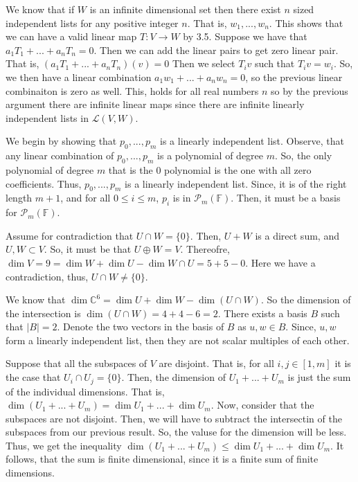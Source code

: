 \documentclass[10pt, twocolumn]{article}
\newcommand{\C}{\mathbb{C}}
\newcommand{\F}{\mathbb{F}}
\newcommand{\poly}[2]{\mathcal{P}_{#1}\left(#2\right)}
\begin{document}
\begin{q}[9]
	We know that if $ W $ is an infinite dimensional set then there exist $ n $ sized independent lists for any positive integer $ n $. 
	That is, $ w_1, ..., w_n $.
	This shows that we can have a valid linear map $ T: V \to W $ by 3.5. 
	Suppose we have that $ a_1 T_1 + ... + a_n T_n = 0 $. 
	Then we can add the linear pairs to get zero linear pair. 
	That is, 
	$ (a_1 T_1 + ... + a_n T_n)(v) = 0 $
	Then we select $ T_i v $ such that $ T_i v = w_i $. 
	So, we then have a linear combination $ a_1 w_1 + ... + a_n w_n = 0 $, so the previous linear combinaiton is zero as well.
	This, holds for all real numbers $ n$ so by the previous argument there are  infinite linear maps since there are infinite linearly independent lists in $ \mathcal{L} (V, W) $.
\end{q}
\begin{q}[10]
	We begin by showing that $ p_0,..., p_m $ is a linearly independent list. 	
	Observe, that any linear combination of $ p_0,..., p_m $ is a polynomial of degree $ m $. 
	So, the only polynomial of degree $ m $ that is the $ 0 $ polynomial is the one with all zero coefficients. 
	Thus, $ p_0,..., p_m $ is a linearly independent list. 
	Since, it is of the right length $ m + 1 $, and for all $ 0 \leq i \leq m $, $ p_i $ is in $ \poly{m}{\F} $.
	Then, it must be a basis for $ \poly{m}{\F} $.
\end{q}
\begin{q}[12]
	Assume for contradiction that $ U \cap W = \{0\}$.
	Then, $ U + W $ is a direct sum, and $ U, W \subset V $. 
	So, it must be that $ U \oplus W = V $. 
	Thereofre, $ \dim V = 9 = \dim W + \dim U - \dim W \cap U = 5 + 5 - 0 $. 
	Here we have a contradiction, thus, $ U \cap W \neq \{0\} $.
\end{q}
\begin{q}[13]
	We know that $ \dim \C^6 = \dim U + \dim W - \dim (U \cap W) $. 
	So the dimension of the intersection is $ \dim (U \cap W) = 4 + 4 - 6 = 2 $.
	There exists a basis $ B $ such that $ |B| = 2 $. 
	Denote the two vectors in the basis of $ B $ as $ u, w \in B $. 
	Since, $ u, w $ form a linearly independent list, then they are not scalar multiples of each other.
\end{q}
\begin{q}[14]
	Suppose that all the subspaces of $ V $ are disjoint.
	That is, for all $ i, j \in [1, m] $ it is the case that $ U_i \cap U_j = \{0\} $. 
	Then, the dimension of $ U_1 + ... + U_m $ is just the sum of the individual dimensions. 
	That is, $ \dim (U_1 + ... + U_m) =  \dim U_1 + ... + \dim U_m $. 
	Now, consider that the subspaces are not disjoint. 
	Then, we will have to subtract the intersectin of the subspaces from our previous result.
	So, the valuse for the dimension will be less. 
	Thus, we get the inequality
	$ \dim (U_1 + ... + U_m) \leq  \dim U_1 + ... + \dim U_m $.  
	It follows, that the sum is finite dimensional, since it is a finite sum of finite dimensions. 
\end{q}
\end{document}
